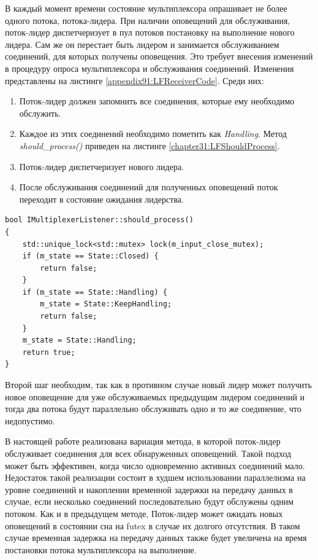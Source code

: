 В каждый момент времени состояние мультиплексора опрашивает не более одного потока, потока-лидера. При наличии оповещений для обслуживания, поток-лидер диспетчеризует в пул потоков постановку на выполнение нового лидера. Сам же он перестает быть лидером и занимается обслуживанием соединений, для которых получены оповещения. Это требует внесения изменений в процедуру опроса мультиплексора и обслуживания соединений. Изменения представлены на листинге \ref{appendix91:LFReceiverCode}. Среди них:
\begin{enumerate}
\item Поток-лидер должен запомнить все соединения, которые ему необходимо обслужить.
\item Каждое из этих соединений необходимо пометить как \textit{Handling}. Метод \textit{should\_process()} приведен на листинге \ref{chapter31:LFShouldProcess}.
\item Поток-лидер диспетчеризует нового лидера.
\item После обслуживания соединений для полученных оповещений поток переходит в состояние ожидания лидерства.
\end{enumerate}

\begin{lstlisting}[float=!h,caption={Процедура подготовления соединения к обслуживанию в модели обслуживания соединений ''Лидер/Последователи``},label={chapter31:LFShouldProcess},frame=tlrb]
bool IMultiplexerListener::should_process()
{
    std::unique_lock<std::mutex> lock(m_input_close_mutex);
    if (m_state == State::Closed) {
        return false;
    }
    if (m_state == State::Handling) {
        m_state = State::KeepHandling;
        return false;
    }
    m_state = State::Handling;
    return true;
}
\end{lstlisting}

Второй шаг необходим, так как в противном случае новый лидер может получить новое оповещение для уже обслуживаемых предыдущим лидером соединений и тогда два потока будут параллельно обслуживать одно и то же соединение, что недопустимо.

В настоящей работе реализована вариация метода, в которой поток-лидер обслуживает соединения для всех обнаруженных оповещений. Такой подход может быть эффективен, когда число одновременно активных соединений мало. Недостаток такой реализации состоит в худшем использовании параллелизма на уровне соединений и накоплении временной задержки на передачу данных в случае, если несколько соединений последовательно будут обслужены одним потоком. Как и в предыдущем методе, Поток-лидер может ожидать новых оповещений в состоянии сна на futex в случае их долгого отсутствия. В таком случае временная задержка на передачу данных также будет увеличена на время постановки потока мультиплексора на выполнение.

